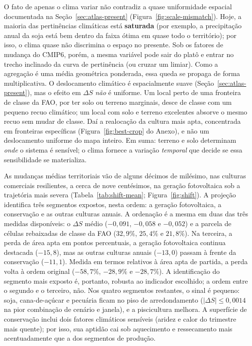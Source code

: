 O fato de apenas o clima variar não contradiz a quase uniformidade espacial documentada na
Seção~\ref{sec:atlas-present} (Figura~\ref{fig:scale-mismatch}). Hoje, a maioria das pertinências
climáticas está \textbf{saturada} (por exemplo, a precipitação anual da soja está bem dentro da faixa
ótima em quase todo o território); por isso, o clima quase não discrimina o espaço no presente. Sob os
fatores de mudança do CMIP6, porém, a mesma variável pode sair do platô e entrar no trecho inclinado da
curva de pertinência (ou cruzar um limiar). Como a agregação é uma média geométrica ponderada, essa
queda se propaga de forma multiplicativa. O deslocamento climático é espacialmente suave
(Seção~\ref{sec:atlas-present}), mas o efeito em $\Delta S$ \emph{não} é uniforme. Um local perto de
uma fronteira de classe da FAO, por ter solo ou terreno marginais, desce de classe com um pequeno recuo
climático; um local com solo e terreno excelentes absorve o mesmo recuo sem mudar de classe. Daí a
realocação da cultura mais apta, concentrada em fronteiras específicas (Figura~\ref{fig:best-crop} do
Anexo), e não um deslocamento uniforme do mapa inteiro. Em suma: terreno e solo determinam
\emph{onde} o sistema é sensível; o clima fornece a variação \emph{temporal} que decide se essa
sensibilidade se materializa.

As mudanças médias territoriais vão de alguns décimos de milésimo, nas culturas comerciais
resilientes, a cerca de nove centésimos, na geração fotovoltaica sob a trajetória mais severa
(Tabela~\ref{tab:shift-mean}; Figura~\ref{fig:shift}). A projeção identifica três segmentos expostos,
nesta ordem: a geração fotovoltaica, a conservação e as outras culturas anuais. A ordenação é a mesma
em duas das três medidas disponíveis: o $\Delta S$ médio ($-0{,}091$, $-0{,}058$ e $-0{,}052$) e a
parcela de células rebaixadas de classe da FAO ($32{,}9\%$, $25{,}4\%$ e $21{,}8\%$). Na terceira, a
perda de área apta em pontos percentuais, a geração fotovoltaica continua destacada ($-15{,}8$), mas
as outras culturas anuais ($-13{,}0$) passam à frente da conservação ($-11{,}1$). Medida em termos
relativos à área apta de partida, a perda volta à ordem original ($-58{,}7\%$, $-28{,}9\%$ e
$-28{,}7\%$). A identificação do segmento mais exposto é, portanto, robusta ao indicador escolhido; a
ordem entre o segundo e o terceiro, não. Nos quatro segmentos restantes, o sinal é pequeno: soja,
cana-de-açúcar e pecuária ficam no piso de arredondamento ($|\Delta S| \le 0{,}0014$ na pior
combinação de cenário e janela), e a piscicultura melhora. A superfície de conservação inclui dois
fatores climáticos sensíveis (aridez e calor do trimestre mais quente); por isso, sua aptidão cai sob
aquecimento e ressecamento mais acentuadamente que a dos segmentos de produção.

